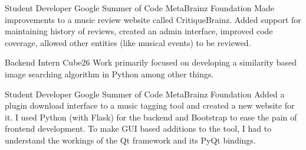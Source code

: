     {Student Developer}
    {Google Summer of Code}
    {MetaBrainz Foundation}
    {}
    {
        Made improvements to a music review website called CritiqueBrainz. Added support for maintaining history of reviews, created an admin interface, improved code coverage, allowed other entities (like musical events) to be reviewed.
    }
    \vspace*{0.2\baselineskip}

    {Backend Intern}
    {Cube26}
    {}
    {}
    {
        Work primarily focused on developing a similarity based image searching algorithm in Python among other things.
    }
    \vspace*{0.2\baselineskip}

    {Student Developer}
    {Google Summer of Code}
    {MetaBrainz Foundation}
    {}
    {
        Added a plugin download interface to a music tagging tool and created a new website for it.
        \newline
        I used Python (with Flask) for the backend and Bootstrap to ease the pain of frontend development.
        To make GUI based additions to the tool, I had to understand the workings of the Qt framework and its PyQt bindings.
    }
    \vspace*{0.2\baselineskip}

